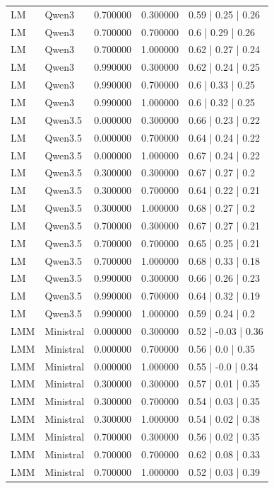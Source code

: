 \begin{longtable}{lllll}
LM & Qwen3 & 0.700000 & 0.300000 & 0.59 | 0.25 | 0.26 \\
LM & Qwen3 & 0.700000 & 0.700000 & 0.6 | 0.29 | 0.26 \\
LM & Qwen3 & 0.700000 & 1.000000 & 0.62 | 0.27 | 0.24 \\
LM & Qwen3 & 0.990000 & 0.300000 & 0.62 | 0.24 | 0.25 \\
LM & Qwen3 & 0.990000 & 0.700000 & 0.6 | 0.33 | 0.25 \\
LM & Qwen3 & 0.990000 & 1.000000 & 0.6 | 0.32 | 0.25 \\
LM & Qwen3.5 & 0.000000 & 0.300000 & 0.66 | 0.23 | 0.22 \\
LM & Qwen3.5 & 0.000000 & 0.700000 & 0.64 | 0.24 | 0.22 \\
LM & Qwen3.5 & 0.000000 & 1.000000 & 0.67 | 0.24 | 0.22 \\
LM & Qwen3.5 & 0.300000 & 0.300000 & 0.67 | 0.27 | 0.2 \\
LM & Qwen3.5 & 0.300000 & 0.700000 & 0.64 | 0.22 | 0.21 \\
LM & Qwen3.5 & 0.300000 & 1.000000 & 0.68 | 0.27 | 0.2 \\
LM & Qwen3.5 & 0.700000 & 0.300000 & 0.67 | 0.27 | 0.21 \\
LM & Qwen3.5 & 0.700000 & 0.700000 & 0.65 | 0.25 | 0.21 \\
LM & Qwen3.5 & 0.700000 & 1.000000 & 0.68 | 0.33 | 0.18 \\
LM & Qwen3.5 & 0.990000 & 0.300000 & 0.66 | 0.26 | 0.23 \\
LM & Qwen3.5 & 0.990000 & 0.700000 & 0.64 | 0.32 | 0.19 \\
LM & Qwen3.5 & 0.990000 & 1.000000 & 0.59 | 0.24 | 0.2 \\
LMM & Ministral & 0.000000 & 0.300000 & 0.52 | -0.03 | 0.36 \\
LMM & Ministral & 0.000000 & 0.700000 & 0.56 | 0.0 | 0.35 \\
LMM & Ministral & 0.000000 & 1.000000 & 0.55 | -0.0 | 0.34 \\
LMM & Ministral & 0.300000 & 0.300000 & 0.57 | 0.01 | 0.35 \\
LMM & Ministral & 0.300000 & 0.700000 & 0.54 | 0.03 | 0.35 \\
LMM & Ministral & 0.300000 & 1.000000 & 0.54 | 0.02 | 0.38 \\
LMM & Ministral & 0.700000 & 0.300000 & 0.56 | 0.02 | 0.35 \\
LMM & Ministral & 0.700000 & 0.700000 & 0.62 | 0.08 | 0.33 \\
LMM & Ministral & 0.700000 & 1.000000 & 0.52 | 0.03 | 0.39 \\

\end{longtable}
